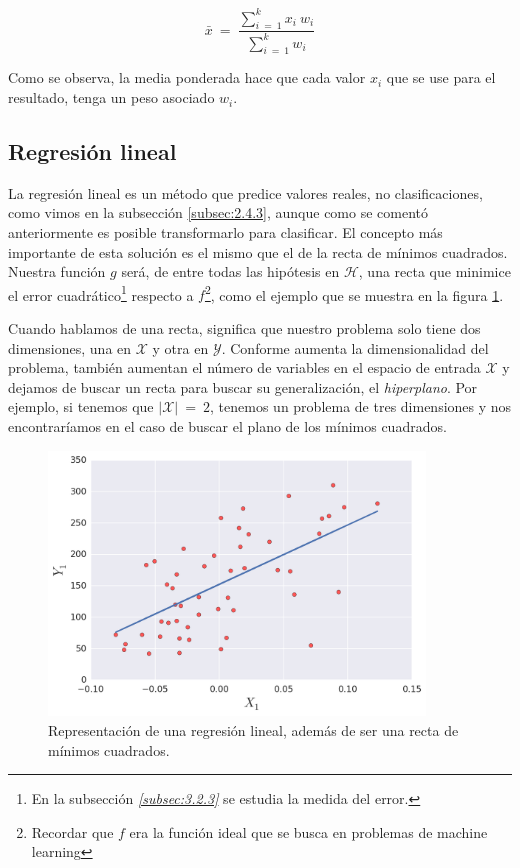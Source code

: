 $$
\bar{x}\:=\:\frac{\sum_{i\:=\:1}^{k}x_{i}\:w_{i}}{\sum_{i\:=\:1}^{k}w_{i}}
$$

Como se observa, la media ponderada hace que cada valor $x_i$ que se use para el resultado, tenga un peso asociado $w_{i}$.

\subsection{Regresión lineal} \label{subsec:2.5.3}

La regresión lineal es un método que predice valores reales, no clasificaciones, como vimos en la subsección \ref{subsec:2.4.3}, aunque como se comentó anteriormente es posible transformarlo para clasificar. El concepto más importante de esta solución es el mismo que el de la recta de mínimos cuadrados. Nuestra función $g$ será, de entre todas las hipótesis en $\mathcal{H}$, una recta que minimice el error cuadrático\footnote{En la subsección \emph{\ref{subsec:3.2.3} } se estudia la medida del error.} respecto a $f$\footnote{Recordar que $f$ era la función ideal que se busca en problemas de machine learning}, como el ejemplo que se muestra en la figura \ref{fig:2.4}.

Cuando hablamos de una recta, significa que nuestro problema solo tiene dos dimensiones, una en $\mathcal{X}$ y otra en $\mathcal{Y}$. Conforme aumenta la dimensionalidad del problema, también aumentan el número de variables en el espacio de entrada $\mathcal{X}$ y dejamos de buscar un recta para buscar su generalización, el \emph{hiperplano}. Por ejemplo, si tenemos que $|\mathcal{X}|\:=\:2$, tenemos un problema de tres dimensiones y nos encontraríamos en el caso de buscar el plano de los mínimos cuadrados.

\begin{figure}[ht]
  \centering
  \includegraphics[width=100mm]{figures/ch_02/regression_example.png}
  \caption{Representación de una regresión lineal, además de ser una recta de mínimos cuadrados.}
  \label{fig:2.4}
\end{figure}

